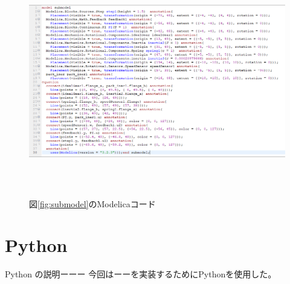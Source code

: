   \begin{figure}[t]
	\centering
	\includegraphics[width=16.5cm,height=10cm]{./Image/sub_modelica.png}
	\caption{図\ref{fig:submodel}のModelicaコード}
	\label{fig:sub_modelica}
  \end{figure}

  \section{Python}\label{python}
  Python の説明ーーー
  今回はーーを実装するためにPythonを使用した。
